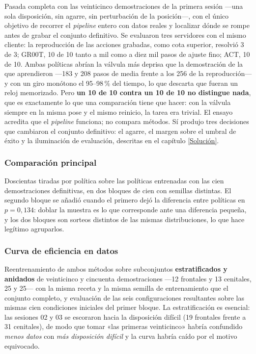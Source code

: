 Pasada completa con las veinticinco demostraciones de la primera sesión —una sola disposición,
sin agarre, sin perturbación de la posición—, con el único objetivo de recorrer el \textit{pipeline} entero
con datos reales y localizar dónde se rompe antes de grabar el conjunto definitivo. Se evaluaron
tres servidores con el mismo cliente: la reproducción de las acciones grabadas, como cota
superior, resolvió 3 de 3; GR00T, 10 de 10 tanto a mil como a diez mil pasos de ajuste fino; ACT,
10 de 10. Ambas políticas abrían la válvula más deprisa que la demostración de la que aprendieron
—183 y 208 pasos de media frente a los 256 de la reproducción— y con un giro monótono el 95--98\,\%
del tiempo, lo que descarta que fueran un reloj memorizado. Pero \textbf{un 10 de 10 contra un 10
de 10 no distingue nada}, que es exactamente lo que una comparación tiene que hacer: con la válvula
siempre en la misma pose y el mismo reinicio, la tarea era trivial. El ensayo acredita que el \textit{pipeline}
funciona; no compara métodos. Sí produjo tres decisiones que cambiaron el conjunto definitivo: el
agarre, el margen sobre el umbral de éxito y la iluminación de evaluación, descritas en el capítulo
\ref{Solución}.

\subsubsection{Comparación principal}

Doscientas tiradas por política sobre las políticas entrenadas con las cien demostraciones
definitivas, en dos bloques de cien con semillas distintas. El segundo bloque se añadió cuando el
primero dejó la diferencia entre políticas en $p = 0{,}134$: doblar la muestra es lo que
corresponde ante una diferencia pequeña, y los dos bloques son sorteos distintos de las mismas
distribuciones, lo que hace legítimo agruparlos.

\subsubsection{Curva de eficiencia en datos}

Reentrenamiento de ambos métodos sobre subconjuntos \textbf{estratificados y anidados} de
veinticinco y cincuenta demostraciones —12 frontales y 13 cenitales, 25 y 25— con la misma receta
y la misma semilla de entrenamiento que el conjunto completo, y evaluación de las seis
configuraciones resultantes sobre las mismas cien condiciones iniciales del primer bloque. La
estratificación es esencial: las sesiones 02 y 03 se escoraron hacia la disposición difícil (19
frontales frente a 31 cenitales), de modo que tomar «las primeras veinticinco» habría confundido
\textit{menos datos} con \textit{más disposición difícil} y la curva habría caído por el motivo
equivocado.

